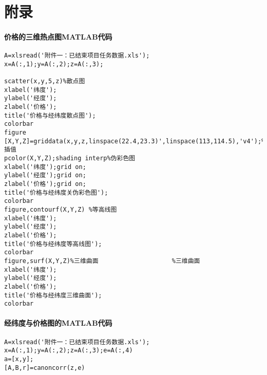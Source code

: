 \documentclass{ctexart}
\begin{document}
\newpage  
\appendix 
\section{附录}
\paragraph{价格的三维热点图MATLAB代码}
\begin{verbatim}
A=xlsread('附件一：已结束项目任务数据.xls');
x=A(:,1);y=A(:,2);z=A(:,3);

scatter(x,y,5,z)%散点图
xlabel('纬度');
ylabel('经度');
zlabel('价格');
title('价格与经纬度散点图');
colorbar
figure
[X,Y,Z]=griddata(x,y,z,linspace(22.4,23.3)',linspace(113,114.5),'v4');%插值
pcolor(X,Y,Z);shading interp%伪彩色图
xlabel('纬度');grid on;
ylabel('经度');grid on;
zlabel('价格');grid on;
title('价格与经纬度关伪彩色图');
colorbar
figure,contourf(X,Y,Z) %等高线图
xlabel('纬度');
ylabel('经度');
zlabel('价格');
title('价格与经纬度等高线图');
colorbar
figure,surf(X,Y,Z)%三维曲面                    %三维曲面
xlabel('纬度');
ylabel('经度');
zlabel('价格');
title('价格与经纬度三维曲面');
colorbar
\end{verbatim}
\paragraph{经纬度与价格图的MATLAB代码}
\begin{verbatim}
A=xlsread('附件一：已结束项目任务数据.xls');
x=A(:,1);y=A(:,2);z=A(:,3);e=A(:,4)
a=[x,y];
[A,B,r]=canoncorr(z,e)
\end{verbatim}
\end{document}
